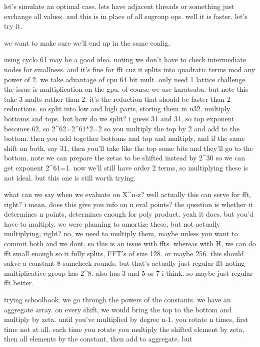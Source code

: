 let's simulate an optimal case. lets have adjacent threads or something just exchange all values. and this is in place of all sugroup ops. 
well it is faster. let's try it. 

we want to make sure we'll end up in the same config.









using cyclo 61 may be a good idea. noting we don't have to check intermediate nodes for smallness.
and it's fine for fft cuz it splits into quadratic terms mod any power of 2. 
we take advantage of cpu 64 bit mult. only need 1 lattice challenge. the issue is multiplication on the gpu. of course we use karatsuba. but note this take 3 mults rather than 2. it's the reduction that should be faster than 2 reductions. so split into low and high parts, storing them in u32. multiply bottoms and tops. but how do we split? i guess 31 and 31, so top exponent becomes 62, so 2^62=2^61*2=2 so you multiply the top by 2 and add to the bottom. then you add together bottoms and top and multiply, and if the same shift on both, say 31, then you'll take like the top some bits and they'll go to the bottom. 
note we can prepare the zetas to be shifted instead by 2^30 so we can get exponent 2^61=1.
now we'll still have order 2 terms, so multiplying these is not ideal. but this one is still worth trying. 



what can we say when we evaluate on X^n-z? well actually this can serve for fft, right? i mean, does this give you info on n eval points? the question is whether it determines n points, determines enough for poly product. yeah it does. but you'd have to multiply. we were planning to amortize these, but not actually multiplying, right? no, we need to multiply them, maybe unless you want to commit both and we dont. so this is an issue with ffts. whereas with H, we can do fft small enough so it fully splits, FFT's of size 128. or maybe 256. this should sakve a constant 8 sumcheck rounds. but that's actually just regular fft noting multiplicative group has 2^8. also has 3 and 5 or 7 i think. so maybe just regular fft better. 




trying schoolbook. 
we go through the powers of the constants. we have an aggregate array.
on every shift, we would bring the top to the bottom and multiply by zeta. until you've multiplied by degree n-1. 
you rotate n times, first time not at all. 
each time you rotate you multiply the shifted element by zeta, then all elements by the constant, then add to aggregate. but 

